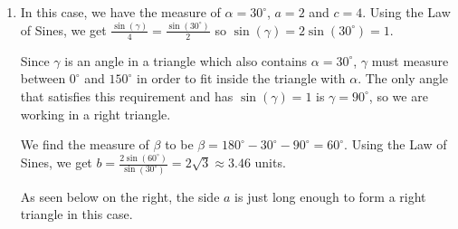 \documentclass{ximera}
\begin{document}
\begin{example}
\begin{explanation}
\begin{enumerate}

\addtocounter{enumi}{3}


\item  In this case, we have the measure of $\alpha = 30^{\circ}$, $a = 2$ and $c=4$.  Using the Law of Sines, we get  $\frac{\sin(\gamma)}{4} = \frac{\sin\left(30^{\circ}\right)}{2}$ so $\sin(\gamma) = 2 \sin\left(30^{\circ}\right) = 1$.  

 

Since  $\gamma$ is an angle in a triangle which also contains $\alpha = 30^{\circ}$,  $\gamma$ must measure between $0^{\circ}$ and $150^{\circ}$ in order to fit inside the triangle with $\alpha$.   The only angle that satisfies this requirement and has $\sin(\gamma) = 1$ is  $\gamma = 90^{\circ}$, so we are working in a right triangle. 

 

 We find the measure of $\beta$ to be  $\beta = 180^{\circ} - 30^{\circ} - 90^{\circ} = 60^{\circ}$. Using the Law of Sines, we get $b = \frac{2 \sin\left(60^{\circ}\right)}{\sin\left(30^{\circ}\right)} = 2 \sqrt{3} \approx 3.46$ units.  
 
  
 
 As seen below on the right, the side $a$ is just long enough to form a  right triangle in this case.


\begin{image}
\end{image}
\end{enumerate}
\end{explanation}
\end{example}
\end{document}
